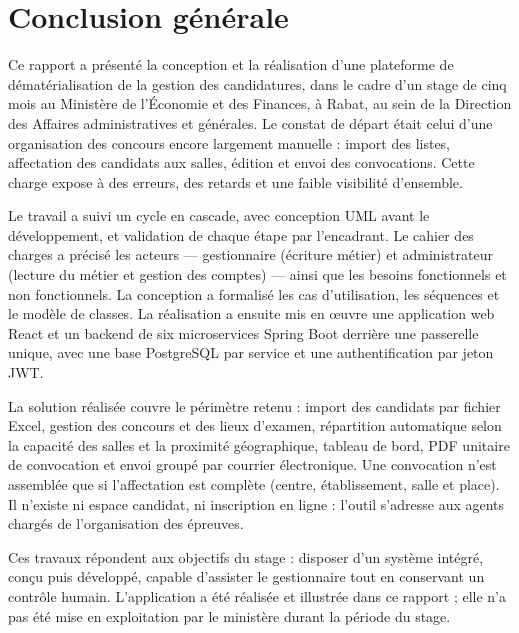 \chapter*{Conclusion générale}
\adjustmtc
\thispagestyle{MyStyle}
\begin{onehalfspace}

Ce rapport a présenté la conception et la réalisation d'une plateforme de dématérialisation de la gestion des candidatures, dans le cadre d'un stage de cinq mois au Ministère de l'Économie et des Finances, à Rabat, au sein de la Direction des Affaires administratives et générales. Le constat de départ était celui d'une organisation des concours encore largement manuelle : import des listes, affectation des candidats aux salles, édition et envoi des convocations. Cette charge expose à des erreurs, des retards et une faible visibilité d'ensemble.

Le travail a suivi un cycle en cascade, avec conception UML avant le développement, et validation de chaque étape par l'encadrant. Le cahier des charges a précisé les acteurs --- gestionnaire (écriture métier) et administrateur (lecture du métier et gestion des comptes) --- ainsi que les besoins fonctionnels et non fonctionnels. La conception a formalisé les cas d'utilisation, les séquences et le modèle de classes. La réalisation a ensuite mis en œuvre une application web React et un backend de six microservices Spring Boot derrière une passerelle unique, avec une base PostgreSQL par service et une authentification par jeton JWT.

La solution réalisée couvre le périmètre retenu : import des candidats par fichier Excel, gestion des concours et des lieux d'examen, répartition automatique selon la capacité des salles et la proximité géographique, tableau de bord, PDF unitaire de convocation et envoi groupé par courrier électronique. Une convocation n'est assemblée que si l'affectation est complète (centre, établissement, salle et place). Il n'existe ni espace candidat, ni inscription en ligne : l'outil s'adresse aux agents chargés de l'organisation des épreuves.

Ces travaux répondent aux objectifs du stage : disposer d'un système intégré, conçu puis développé, capable d'assister le gestionnaire tout en conservant un contrôle humain. L'application a été réalisée et illustrée dans ce rapport ; elle n'a pas été mise en exploitation par le ministère durant la période du stage.

\end{onehalfspace}

